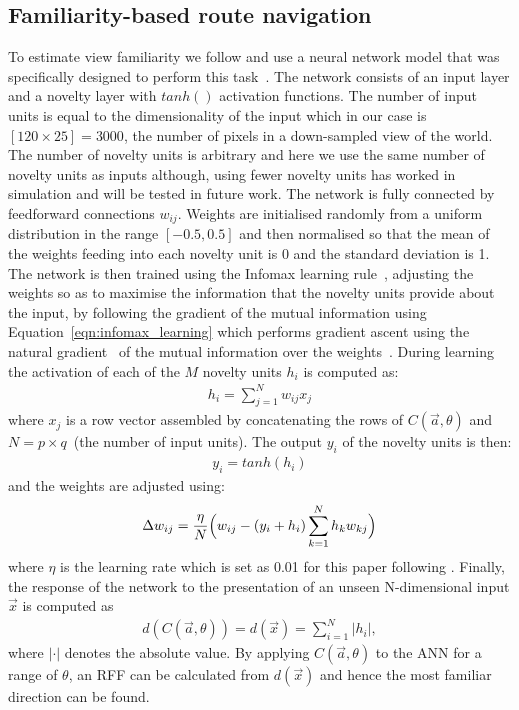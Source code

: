 \documentclass[letterpaper]{article}
\begin{document}
\subsection{Familiarity-based route navigation}
\label{sec:familiarity_infomax}
To estimate view familiarity we follow \citet{Baddeley2012} and use a neural network model that was specifically designed to perform this task~\citep{Lulham2011}. 
The network consists of an input layer and a novelty layer with $tanh()$ activation functions. 
The number of input units is equal to the dimensionality of the input which in our case is $[120 \times 25]=3000$, the number of pixels in a down-sampled view of the world. 
The number of novelty units is arbitrary and here we use the same number of novelty units as inputs although, using fewer novelty units has worked in simulation and will be tested in future work.
The network is fully connected by feedforward connections $w_{ij}$. 
Weights are initialised randomly from a uniform distribution in the range $[-0.5,0.5]$ and then normalised so that the mean of the weights feeding into each novelty unit is \num{0} and the standard deviation is \num{1}. 
The network is then trained using the Infomax learning rule~\citep{Bell1995}, adjusting the weights so as to maximise the information that the novelty units provide about the input, by following the gradient of the mutual information using Equation~\ref{eqn:infomax_learning} which performs gradient ascent using the natural gradient~\citep{Amari1998} of the mutual information over the weights~\citep{Lee1997}.
During learning the activation of each of the $M$ novelty units $h_{i}$ is computed as:
%
\begin{align}
    h_{i}=\sum\limits_{j=1}^N w_{ij}x_{j}   \label{eqn:infomax_activation}
\end{align}
%
where $x_{j}$ is a row vector assembled by concatenating the rows of $C(\vec{a}, \theta)$ and $N=p \times q$~(the number of input units).
The output $y_{i}$ of the novelty units is then:
%
\begin{align}
    y_{i}=tanh(h_{i})   \label{eqn:infomax_output}
\end{align}
%
and the weights are adjusted using: 
%
\begin{align}
    \Delta w_{ij}=\frac{\eta}{N} \Bigl( w_{ij} - (y_{i} + h_{i}) \sum\limits_{k=1}^N h_{k}w_{kj} \Bigr)   \label{eqn:infomax_learning}
\end{align}
%
where $\eta$ is the learning rate which is set as \num{0.01} for this paper following \citet{Baddeley2012}. 
Finally, the response of the network to the presentation of an unseen N-dimensional input $\vec{x}$ is computed as
%
\begin{align}
    d(C(\vec{a}, \theta)) = d(\vec{x}) = \sum\limits_{i=1}^N |h_{i}|, \label{eqn:infomax_response}
\end{align}
%
where $|\cdot|$ denotes the absolute value.
By applying $C(\vec{a}, \theta)$ to the ANN for a range of $\theta$, an RFF can be calculated from $d(\vec{x})$ and hence the most familiar direction can be found.
\end{document}
